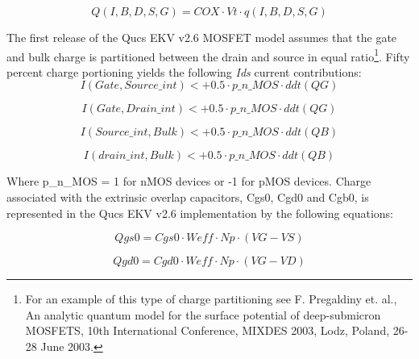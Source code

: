 \hspace{20mm}     \begin{equation}
			Q(I,B,D,S,G) = COX \cdot Vt \cdot q(I,B,D,S,G)
                  \end{equation}  

The first release of the Qucs EKV v2.6 MOSFET model assumes that the
gate and bulk charge is partitioned between the drain and source in
equal ratio\footnote{For an example of this type of charge
partitioning see F. Pregaldiny et. al., An analytic quantum model for
the surface potential of deep-submicron MOSFETS, 10th International
Conference, MIXDES 2003, Lodz, Poland, 26-28 June 2003.}. Fifty
percent charge portioning yields the following \textit{Ids} current
contributions:
\hspace{20mm}     \begin{equation} 
			I(Gate, Source\_int) <+ 0.5 \cdot p\_n\_MOS \cdot ddt(QG)
                  \end{equation}  

\hspace{20mm}     \begin{equation}
			I(Gate, Drain\_int) <+ 0.5 \cdot p\_n\_MOS \cdot ddt(QG)
                  \end{equation}  

\hspace{20mm}     \begin{equation}
			I(Source\_int, Bulk) <+ 0.5 \cdot p\_n\_MOS \cdot ddt(QB)
                  \end{equation} 

\hspace{20mm}     \begin{equation}
			I(drain\_int, Bulk) <+ 0.5 \cdot p\_n\_MOS \cdot ddt(QB)
                  \end{equation}  


\vspace{8mm}
Where p\_n\_MOS = 1 for nMOS devices or -1 for pMOS devices. Charge
associated with the extrinsic overlap capacitors, Cgs0, Cgd0 and Cgb0,
is represented in the Qucs EKV v2.6 implementation by the following
equations:

\hspace{20mm}     \begin{equation} 
			Qgs0 = Cgs0 \cdot Weff \cdot Np \cdot (VG - VS)
                  \end{equation}  

\hspace{20mm}     \begin{equation} 
			Qgd0 = Cgd0 \cdot Weff \cdot Np \cdot (VG - VD)
                  \end{equation}  

